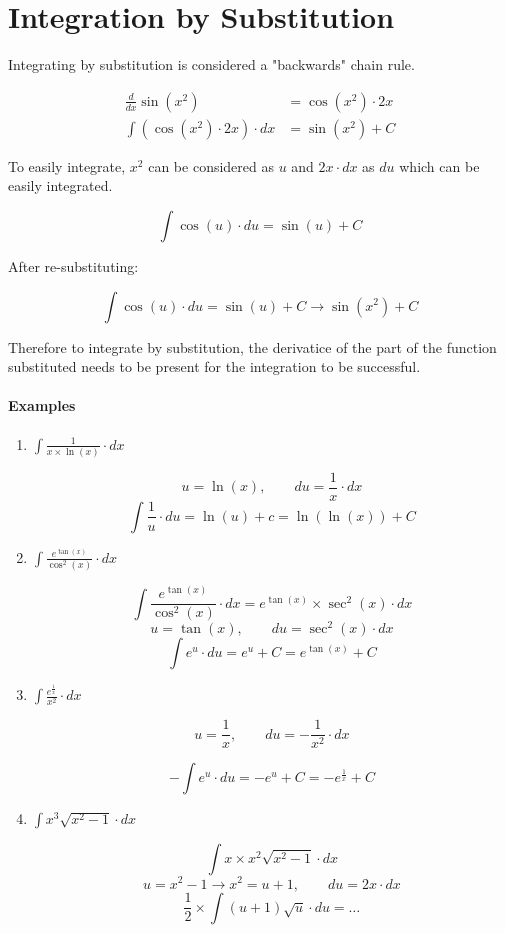 \documentclass[a4paper]{book}
\begin{document}
\chapter{Integration by Substitution}

Integrating by substitution is considered a "backwards" chain rule.

\begin{align*}
\frac{d}{dx}\sin(x^2) & = \cos(x^2) \cdot 2x \\
\int (\cos(x^2) \cdot 2x) \cdot dx & = \sin(x^2) + C
\end{align*}

\noindent To easily integrate, $x^2$ can be considered as $u$ and $2x \cdot dx$ as $du$ which can be easily integrated.

\[\int \cos(u) \cdot du = \sin(u) + C\]

After re-substituting:

\[\int \cos(u) \cdot du = \sin(u) + C \to \sin(x^2) + C\]

Therefore to integrate by substitution, the derivatice of the part of the function substituted
needs to be present for the integration to be successful.

\subsubsection{Examples}

\begin{enumerate}

\item $\displaystyle{\int \frac{1}{x \times \ln(x)} \cdot dx}$

  \[u = \ln(x), \qquad du = \frac{1}{x} \cdot dx\]
  \[\int \frac{1}{u} \cdot du = \ln(u) + c = \ln(\ln(x)) + C\]

\item $\displaystyle{\int \frac{e^{\tan(x)}}{\cos^2(x)} \cdot dx}$

  \[\int \frac{e^{\tan(x)}}{\cos^2(x)} \cdot dx = e^{\tan(x)} \times \sec^2(x) \cdot dx\]
  \[u = \tan(x), \qquad du = \sec^2(x) \cdot dx\]
  \[\int e^u \cdot du = e^u + C = e^{\tan(x)} + C\]

\item $\displaystyle{\int \frac{e^{\frac{1}{x}}}{x^2} \cdot dx}$

  \[u = \frac{1}{x}, \qquad du = -\frac{1}{x^2} \cdot dx\]

  \[-\int e^u \cdot du = -e^u + C = -e^{\frac{1}{x}} + C\]

\item $\displaystyle{\int x^3 \sqrt{x^2 - 1} \cdot dx}$

  \[\int x \times x^2 \sqrt{x^2 - 1} \cdot dx\]
  \[u = x^2 - 1 \to x^2 = u + 1, \qquad du = 2x \cdot dx\]
  \[\frac{1}{2} \times \int (u + 1) \sqrt{u} \cdot du = \ldots\]

\end{enumerate}
\end{document}
